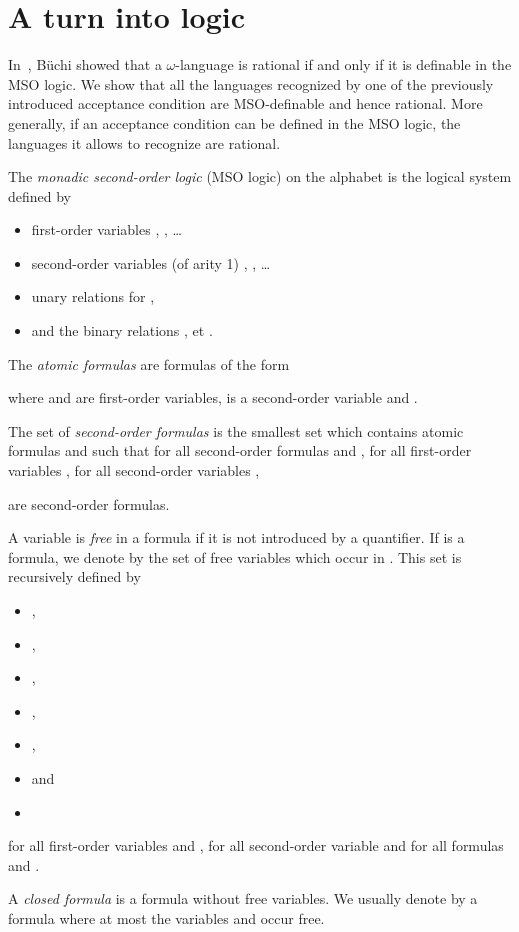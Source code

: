 \documentclass[preprint]{elsarticle}
\newcommand{\Nlanguage}{\ensuremath{\omega}-language\xspace}
\begin{document}
\section{A turn into logic}
In~\cite{Buchi1960}, B\"uchi showed that a \Nlanguage is rational if and only if it is definable in the MSO logic. We show that all the  languages recognized by one of the previously introduced acceptance condition are MSO-definable and hence rational. More generally, if an acceptance condition can be defined in the MSO logic, the languages it allows to recognize are rational.

The \emph{monadic second-order logic} (MSO logic) on the alphabet  is the logical system defined by
\begin{itemize}
\item
first-order variables , ,  \dots
\item
second-order variables (of arity 1) , ,  \dots
\item
unary relations  for ,
\item
and the binary relations ,  et .
\end{itemize}

The \emph{atomic formulas} are formulas of the form

where  and  are first-order variables,  is a second-order variable and .

The set of \emph{second-order formulas} is the smallest set which contains atomic formulas and such that for all second-order formulas  and , for all first-order variables , for all second-order variables ,

are second-order formulas.

A variable is \emph{free} in a formula if it is not introduced by a quantifier. If  is a formula, we denote by  the set of free variables which occur in . This set is recursively defined by
\begin{itemize}
\item
,
\item
,
\item
,
\item
,
\item
,
\item
 and
\item

\end{itemize}
for all first-order variables  and , for all second-order variable  and for all formulas  and .

A \emph{closed formula} is a formula without free variables. We usually denote by  a formula  where at most the variables  and  occur free.
\end{document}
